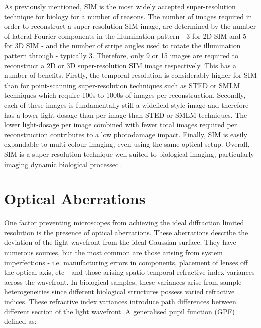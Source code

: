 As previously mentioned, SIM is the most widely accepted 
super-resolution technique for biology for a number of reasons. The 
number of images required in order to reconstruct a super-resolution 
SIM image, are determined by the number of lateral Fourier components 
in the illumination pattern - 3 for 2D SIM and 5 for 3D SIM - and the
number of stripe angles used to rotate the illumination pattern through
- typically 3. Therefore, only 9 or 15 images are required to 
reconstruct a 2D or 3D super-resolution SIM image respectively. This
has a number of benefits. Firstly, the temporal resolution is 
considerably higher for SIM than for point-scanning super-resolution
techniques such as STED or SMLM techniques which require 100s to 1000s
of images per reconstruction\cite{leung2011review,schermelleh2019super}.
Secondly, each of these images is fundamentally still a widefield-style
image and therefore has a lower light-dosage than per image than STED 
or SMLM techniques. The lower light-dosage per image combined with fewer
total images required per reconstruction contributes to a low 
photodamage impact. Finally, SIM is easily expandable to multi-colour 
imaging, even using the same optical 
setup\cite{wu2018faster,allen2014structured}. Overall, SIM is a 
super-resolution technique well suited to biological imaging, 
particularly imaging dynamic biological processed.

\section{Optical Aberrations}
\label{sec:aberrations}

One factor preventing microscopes from achieving the ideal diffraction
limited resolution is the presence of optical 
aberrations\cite{goodman2005introduction,wyant1992basic,wolf1951diffraction}.
These aberrations describe the deviation of the light wavefront
from the ideal Gaussian surface. They have numerous sources, but the most
common are those arising from system imperfections - i.e. manufacturing errors
in components, placement of lenses off the optical axis, etc - and those
arising spatio-temporal refractive index variances across the 
wavefront\cite{kubby2013adaptive,booth2007adaptive}. In biological samples, 
these variances arise from sample heterogeneities since different biological
structures possess varied refractive 
indices\cite{bashkatov2011optical, jacques2013optical, kim2010measurement, sandell2011review}.
These refractive index variances introduce path differences between 
different section of the light wavefront. A generalised pupil function 
(GPF) defined as\cite{antonello2014optimisation}:

